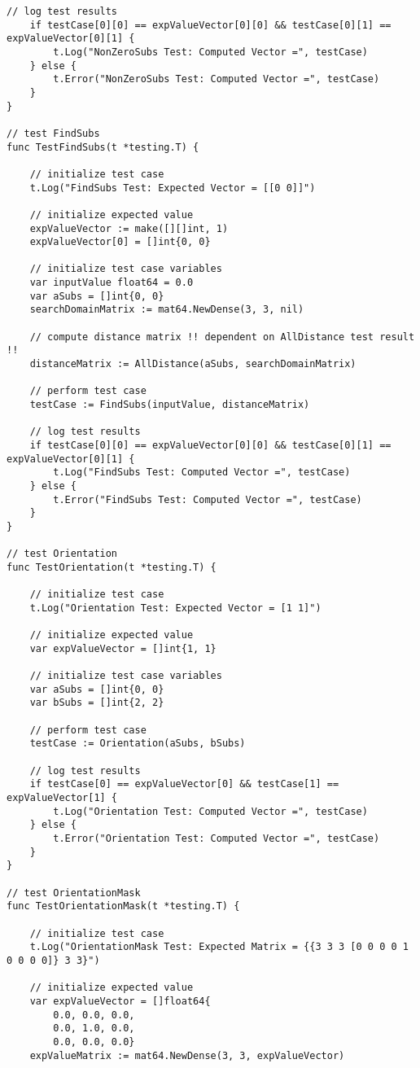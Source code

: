 \begin{lstlisting}[basicstyle=\tiny]
	// log test results
	if testCase[0][0] == expValueVector[0][0] && testCase[0][1] == expValueVector[0][1] {
		t.Log("NonZeroSubs Test: Computed Vector =", testCase)
	} else {
		t.Error("NonZeroSubs Test: Computed Vector =", testCase)
	}
}

// test FindSubs
func TestFindSubs(t *testing.T) {

	// initialize test case
	t.Log("FindSubs Test: Expected Vector = [[0 0]]")

	// initialize expected value
	expValueVector := make([][]int, 1)
	expValueVector[0] = []int{0, 0}

	// initialize test case variables
	var inputValue float64 = 0.0
	var aSubs = []int{0, 0}
	searchDomainMatrix := mat64.NewDense(3, 3, nil)

	// compute distance matrix !! dependent on AllDistance test result !!
	distanceMatrix := AllDistance(aSubs, searchDomainMatrix)

	// perform test case
	testCase := FindSubs(inputValue, distanceMatrix)

	// log test results
	if testCase[0][0] == expValueVector[0][0] && testCase[0][1] == expValueVector[0][1] {
		t.Log("FindSubs Test: Computed Vector =", testCase)
	} else {
		t.Error("FindSubs Test: Computed Vector =", testCase)
	}
}

// test Orientation
func TestOrientation(t *testing.T) {

	// initialize test case
	t.Log("Orientation Test: Expected Vector = [1 1]")

	// initialize expected value
	var expValueVector = []int{1, 1}

	// initialize test case variables
	var aSubs = []int{0, 0}
	var bSubs = []int{2, 2}

	// perform test case
	testCase := Orientation(aSubs, bSubs)

	// log test results
	if testCase[0] == expValueVector[0] && testCase[1] == expValueVector[1] {
		t.Log("Orientation Test: Computed Vector =", testCase)
	} else {
		t.Error("Orientation Test: Computed Vector =", testCase)
	}
}

// test OrientationMask
func TestOrientationMask(t *testing.T) {

	// initialize test case
	t.Log("OrientationMask Test: Expected Matrix = {{3 3 3 [0 0 0 0 1 0 0 0 0]} 3 3}")

	// initialize expected value
	var expValueVector = []float64{
		0.0, 0.0, 0.0,
		0.0, 1.0, 0.0,
		0.0, 0.0, 0.0}
	expValueMatrix := mat64.NewDense(3, 3, expValueVector)


\end{lstlisting}
